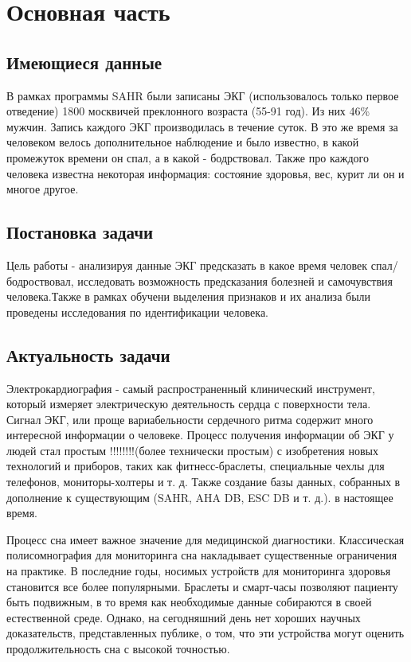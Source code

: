 \chapter{Основная часть}
\section{Имеющиеся данные}
В рамках программы SAHR были записаны ЭКГ (использовалось только первое отведение) 1800 москвичей преклонного возраста (55-91 год). Из них 46\% мужчин. Запись каждого ЭКГ производилась в течение суток. В это же время за человеком велось дополнительное наблюдение и было известно, в какой промежуток времени он спал, а в какой - бодрствовал. Также про каждого человека известна некоторая информация: состояние здоровья, вес, курит ли он и многое другое.
\section{Постановка задачи}

Цель работы - анализируя данные ЭКГ предсказать в какое время человек спал/бодроствовал, исследовать возможность предсказания болезней и самочувствия человека.Также в рамках обучени выделения признаков и их анализа были проведены исследования по идентификации человека.

\section{Актуальность задачи}
Электрокардиография - самый распространенный клинический инструмент, который измеряет электрическую деятельность сердца с поверхности тела. Сигнал ЭКГ, или проще вариабельности сердечного ритма содержит много интересной информации о человеке. Процесс получения информации об ЭКГ у людей стал простым !!!!!!!!(более технически простым) с изобретения новых технологий и приборов, таких как фитнесс-браслеты, специальные чехлы для телефонов, мониторы-холтеры и т. д. Также создание базы данных, собранных в дополнение к существующим (SAHR, AHA DB, ESC DB и т. д.). в настоящее время.

Процесс сна имеет важное значение для медицинской диагностики. Классическая полисомнография для мониторинга сна накладывает существенные ограничения на практике. В последние годы, носимых устройств для мониторинга здоровья становится все более популярными. Браслеты и смарт-часы позволяют пациенту быть подвижным, в то время как необходимые данные собираются в своей естественной среде. Однако, на сегодняшний день нет хороших научных доказательств, представленных публике, о том, что эти устройства могут оценить продолжительность сна с высокой точностью.

